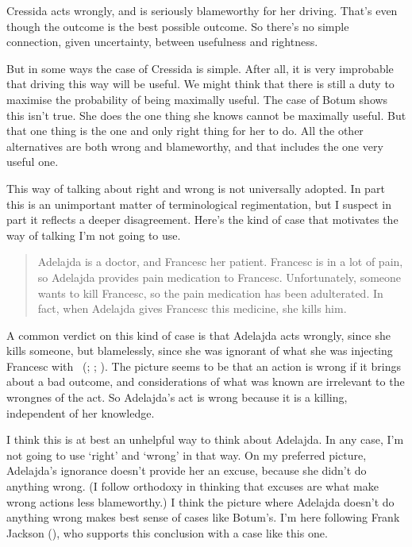 \documentclass[
  10pt,
  letterpaper,
  twoside]{scrbook}
\begin{document}
{Cressida} acts wrongly, and is seriously blameworthy for her driving.
That's even though the outcome is the best possible outcome. So there's
no simple connection, given uncertainty, between usefulness and
rightness.

But in some ways the case of {Cressida} is simple. After all, it is very
improbable that driving this way will be useful. We might think that
there is still a duty to maximise the probability of being maximally
useful. The case of {Botum} shows this isn't true. She does the one
thing she knows cannot be maximally useful. But that one thing is the
one and only right thing for her to do. All the other alternatives are
both wrong and blameworthy, and that includes the one very useful one.

This way of talking about right and wrong is not universally adopted. In
part this is an unimportant matter of terminological regimentation, but
I suspect in part it reflects a deeper disagreement. Here's the kind of
case that motivates the way of talking I'm not going to use.

\begin{quote}
{Adelajda} is a doctor, and {Francesc} her patient. {Francesc} is in a
lot of pain, so {Adelajda} provides pain medication to {Francesc}.
Unfortunately, someone wants to kill {Francesc}, so the pain medication
has been adulterated. In fact, when {Adelajda} gives {Francesc} this
medicine, she kills him.
\end{quote}

A common verdict on this kind of case is that {Adelajda} acts wrongly,
since she kills someone, but blamelessly, since she was ignorant of what
she was injecting {Francesc} with ~(; ;
). The picture seems to be that
an action is wrong if it brings about a bad outcome, and considerations
of what was known are irrelevant to the wrongnes of the act. So
{Adelajda}'s act is wrong because it is a killing, independent of her
knowledge.

I think this is at best an unhelpful way to think about {Adelajda}. In
any case, I'm not going to use `right' and `wrong' in that way. On my
preferred picture, {Adelajda}'s ignorance doesn't provide her an excuse,
because she didn't do anything wrong. (I follow orthodoxy in thinking
that excuses are what make wrong actions less blameworthy.) I think the
picture where {Adelajda} doesn't do anything wrong makes best sense of
cases like {Botum}'s. I'm here following {Frank} Jackson
(), who supports this conclusion with a
case like this one.
\end{document}
